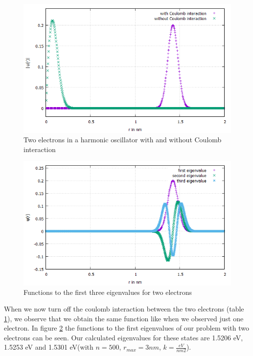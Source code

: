 \documentclass[10pt,a4paper]{article}
\begin{document}
\begin{figure}[h]
	\includegraphics[scale = 0.5]{k1_comparison_2El_n500_verbessert.png}
	\centering
	\caption{Two electrons in a harmonic oscillator with and without Coulomb interaction}
	\label{plot2elrcoulomb}
\end{figure}

\begin{figure}[h]
	\includegraphics[scale = 0.55]{first_eigenvalues.png}
	\centering
	\caption{Functions to the first three eigenvalues for two electrons}
	\label{plot2elef}
\end{figure}

When we now turn off the coulomb interaction between the two electrons (table \ref{plot2elrcoulomb}), we observe that we obtain the same function like when we observed just one electron.
In figure \ref{plot2elef} the functions to the first eigenvalues of our problem with two electrons can be seen. Our calculated eigenvalues for these states are 1.5206 eV, 1.5253 eV and 1.5301 eV(with $n = 500$, $r_{max} = 3 nm$, $k = \frac{eV}{nm2}$).
\clearpage
\end{document}
